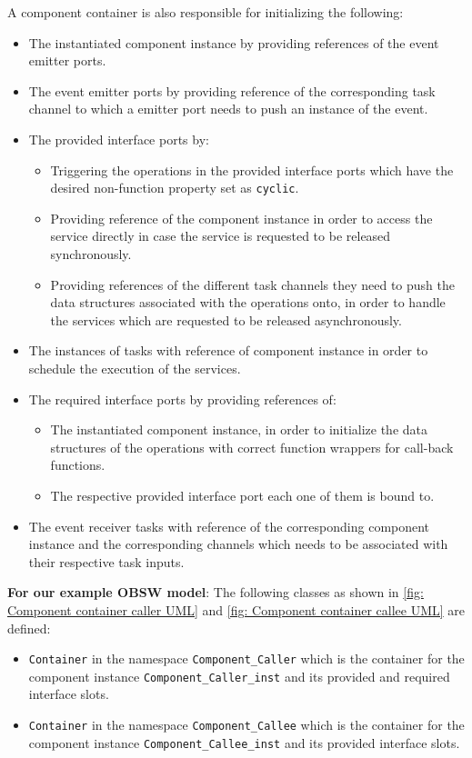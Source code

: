 A component container is also responsible for initializing the following:

\begin{itemize}
\item The instantiated component instance by providing references of the event emitter ports.
\item The event emitter ports by providing reference of the corresponding task channel to which a emitter port needs to push an instance of the event.
\item The provided interface ports by:
\begin{itemize}
\item Triggering the operations in the provided interface ports which have the desired non-function property set as \texttt{cyclic}. 	
\item Providing reference of the component instance in order to access the service directly in case the service is requested to be released synchronously.
\item Providing references of the different task channels they need to push the data structures associated with the operations onto, in order to handle the services which are requested to be released asynchronously. 
\end{itemize}
\item The instances of tasks with reference of component instance in order to schedule the execution of the services.
\item The required interface ports by providing references of:
\begin{itemize}
\item The instantiated component instance, in order to initialize the data structures of the operations with correct function wrappers for call-back functions.
\item The respective provided interface port each one of them is bound to. 
\end{itemize}
\item The event receiver tasks with reference of the corresponding component instance and the corresponding channels which needs to be associated with their respective task inputs.      
\end{itemize}

\textbf{For our example OBSW model}: The following classes as shown in \cref{fig: Component container caller UML} and \cref{fig: Component container callee UML} are defined:

\begin{itemize}
\item \texttt{Container} in the namespace \texttt{Component\allowbreak\_Caller} which is the container for the component instance \texttt{Component\allowbreak\_Caller\allowbreak\_inst} and its provided and required interface slots.
\item \texttt{Container} in the namespace \texttt{Component\allowbreak\_Callee} which is the container for the component instance \texttt{Component\allowbreak\_Callee\allowbreak\_inst} and its provided interface slots. 
\end{itemize}


